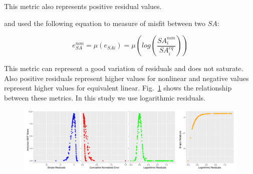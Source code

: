 This metric also represents positive residual values. 

\citet{Assimaki2012} and \citet{Carlton2016comparison} used the following equation to measure of misfit between two $SA$:

\begin{equation}
e_{SA}^{non}=\mu(e_{SAi})=\mu(log(\frac{SA_{i}^{non}}{SA_{i}^{eq}}))
\end{equation}

This metric can represent a good variation of residuals and does not saturate. Also positive residuals represent higher values for nonlinear and negative values represent higher values for equivalent linear. Fig.~\ref{fig:response_spectra_sensitivity} shows the relationship between these metrics. In this study we use logarithmic residuals. 


\begin{figure}
    \centering
    \includegraphics[width=\textwidth]{figures/pdf/response_spectra_sensitivity.pdf}
    \caption{}
    \label{fig:response_spectra_sensitivity}
\end{figure}


